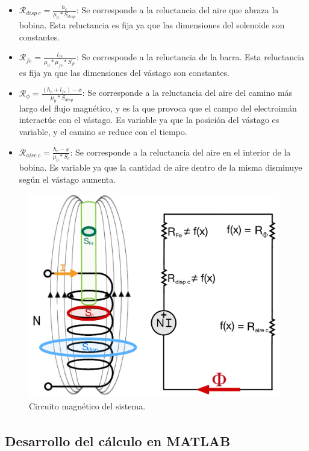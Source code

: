 \begin{itemize}
    \item \(\mathcal{R}_{disp~c}=\frac{h_c}{\mu_0*S_{disp}}\): Se corresponde a la reluctancia del aire que abraza la bobina. Esta reluctancia es fija ya que las dimensiones del solenoide son constantes.
    \item \(\mathcal{R}_{fe}=\frac{l_{fe}}{\mu_0*\mu_{fe}*S_{fe}}\): Se corresponde a la reluctancia de la barra. Esta reluctancia es fija ya que las dimensiones del vástago son constantes.
    \item \(\mathcal{R}_{\phi}=\frac{(h_c+l_{fe})-x}{\mu_0*S_{disp}}\): Se corresponde a la reluctancia del aire del camino más largo del flujo magnético, y es la que provoca que el campo del electroimán interactúe con el vástago. Es variable ya que la posición del vástago es variable, y el camino se reduce con el tiempo.
    \item \(\mathcal{R}_{aire~c}=\frac{h_c-x}{\mu_0*S_c}\): Se corresponde a la reluctancia del aire en el interior de la bobina. Es variable ya que la cantidad de aire dentro de la misma disminuye según el vástago aumenta.
\end{itemize}

\begin{figure}[H]
    \centering
    \includegraphics[width=11cm]{FigurasMemoria/circuitoMag.jpg}
    \caption{Circuito magnético del sistema.}
    \label{fig:circuitoMag} %
\end{figure}

\subsection{Desarrollo del cálculo en MATLAB\textsuperscript{\textregistered}}

